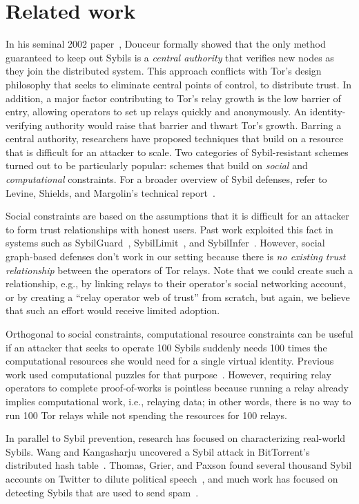 \section{Related work}
\label{sec:related_work}
In his seminal 2002 paper~\cite{Douceur2002a}, Douceur formally showed that the
only method guaranteed to keep out Sybils is a \emph{central authority} that
verifies new nodes as they join the distributed system.  This approach conflicts
with Tor's design philosophy that seeks to eliminate central points of control,
to distribute trust.  In addition, a major factor contributing to Tor's relay
growth is the low barrier of entry, allowing operators to set up relays quickly
and anonymously.  An identity-verifying authority would raise that barrier and
thwart Tor's growth.  Barring a central authority, researchers have proposed
techniques that build on a resource that is difficult for an attacker to scale.
Two categories of Sybil-resistant schemes turned out to be particularly popular:
schemes that build on \emph{social} and \emph{computational} constraints.  For a
broader overview of Sybil defenses, refer to Levine, Shields, and Margolin's
technical report~\cite{Levine2006a}.

Social constraints are based on the assumptions that it is difficult for an
attacker to form trust relationships with honest users.  Past work exploited
this fact in systems such as SybilGuard~\cite{Yu2006a},
SybilLimit~\cite{Yu2008a}, and SybilInfer~\cite{Danezis2009a}.  However, social
graph-based defenses don't work in our setting because there is \emph{no
existing trust relationship} between the operators of Tor relays.  Note that we
could create such a relationship, e.g., by linking relays to their operator's
social networking account, or by creating a ``relay operator web of trust'' from
scratch, but again, we believe that such an effort would receive limited
adoption.

Orthogonal to social constraints, computational resource constraints can be
useful if an attacker that seeks to operate 100 Sybils suddenly needs 100 times
the computational resources she would need for a single virtual identity.
Previous work used computational puzzles for that
purpose~\cite{Borisov2006a,Li2012a}.  However, requiring relay operators to
complete proof-of-works is pointless because running a relay already implies
computational work, i.e., relaying data; in other words, there is no way to run
100 Tor relays while not spending the resources for 100 relays.

In parallel to Sybil prevention, research has focused on characterizing
real-world Sybils.  Wang and Kangasharju uncovered a Sybil attack in
BitTorrent's distributed hash table~\cite{Wang2012a}.  Thomas, Grier, and Paxson
found several thousand Sybil accounts on Twitter to dilute political
speech~\cite{Thomas2012a}, and much work has focused on detecting Sybils that
are used to send spam~\cite{Gao2010a}.
